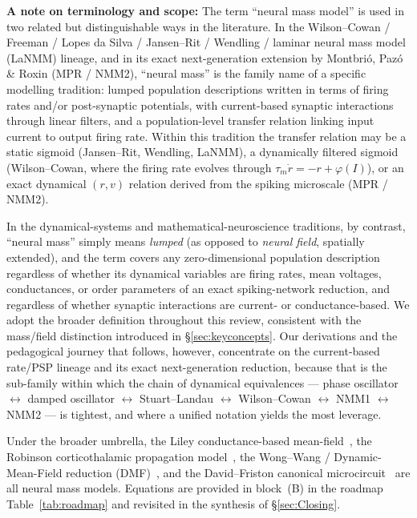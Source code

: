 \documentclass[12pt]{article}
\numberwithin{equation}{section}
\newcommand{\rev}[1]{\begingroup\color{navyblue}#1\endgroup}
\begin{document}
\rev{\textbf{A note on terminology and scope:}  The term ``neural mass model'' is used in two related but distinguishable ways in the literature. In the Wilson--Cowan / Freeman / Lopes da Silva / Jansen--Rit / Wendling / laminar neural mass model (LaNMM) lineage, and in its exact next-generation extension by Montbri\'o, Paz\'o \& Roxin (MPR / NMM2), ``neural mass'' is the family name of a specific modelling tradition: lumped population descriptions written in terms of firing rates and/or post-synaptic potentials, with current-based synaptic interactions through linear filters, and a population-level transfer relation linking input current to output firing rate. Within this tradition the transfer relation may be a static sigmoid (Jansen--Rit, Wendling, LaNMM), a dynamically filtered sigmoid (Wilson--Cowan, where the firing rate evolves through $\tau_m \dot r = -r + \varphi(I)$), or an exact dynamical $(r,v)$ relation derived from the spiking microscale (MPR / NMM2).

In the dynamical-systems and mathematical-neuroscience traditions, by contrast, ``neural mass'' simply means \emph{lumped} (as opposed to \emph{neural field}, spatially extended), and the term covers any zero-dimensional population description regardless of whether its dynamical variables are firing rates, mean voltages, conductances, or order parameters of an exact spiking-network reduction, and regardless of whether synaptic interactions are current- or conductance-based.  We adopt the broader definition throughout this review, consistent with the mass/field distinction introduced in \S\ref{sec:keyconcepts}.  Our derivations and the pedagogical journey that follows, however, concentrate on the current-based rate/PSP lineage and its exact next-generation reduction, because that is the sub-family within which the chain of dynamical equivalences --- phase oscillator $\leftrightarrow$ damped oscillator $\leftrightarrow$ Stuart--Landau $\leftrightarrow$ Wilson--Cowan $\leftrightarrow$ NMM1 $\leftrightarrow$ NMM2 --- is tightest, and where a unified notation yields the most leverage. 

 Under the broader umbrella, the Liley conductance-based mean-field~\cite{Dafilis2013}, the Robinson corticothalamic propagation model~\cite{Robinson2001,Rennie2002}, the Wong--Wang / Dynamic-Mean-Field reduction (DMF)~\cite{WongWang2006,Deco2013}, and the David--Friston canonical microcircuit~\cite{DavidFriston2003} are all neural mass models. Equations are provided in block~(B) in the roadmap Table~\ref{tab:roadmap} and revisited in the synthesis of \S\ref{sec:Closing}.}
\end{document}
